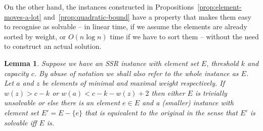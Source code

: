 \documentclass{robinminion}
\newtheorem{lemma}[prop]{Lemma}
\begin{document}
\noindent On the other hand, the instances constructed in Propositions~\ref{prop:element-moves-a-lot} and~\ref{prop:quadratic-bound} have a property that makes them easy to recognise as solvable -- in linear time, if we assume the elements are already sorted by weight, or $O(n \log n)$ time if we have to sort them -- without the need to construct an actual solution.
\begin{lemma}\label{lemma:reduction}
    Suppose we have an SSR instance with element set $E$, threshold $k$ and capacity $c$. By abuse of notation we shall also refer to the whole instance as $E$. Let $a$ and $z$ be elements of minimal and maximal weight respectively. If $w(z) > c-k$ or $w(a) < c-k-w(z) + 2$ then either $E$ is trivially unsolvable or else there is an element $e\in E$ and a (smaller) instance with element set $E' = E-\{e\}$ that is equivalent to the original in the sense that $E'$ is solvable iff $E$ is.
\end{lemma}
\end{document}
